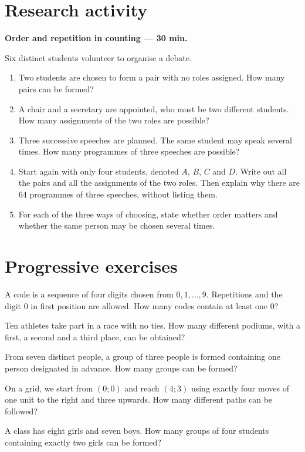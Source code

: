 \section{Research activity}\textbf{Order and repetition in counting --- 30 min.}\par Six distinct students volunteer to organise a debate.
\begin{enumerate}\item Two students are chosen to form a pair with no roles assigned. How many pairs can be formed?
\item A chair and a secretary are appointed, who must be two different students. How many assignments of the two roles are possible?
\item Three successive speeches are planned. The same student may speak several times. How many programmes of three speeches are possible?
\item Start again with only four students, denoted $A$, $B$, $C$ and $D$. Write out all the pairs and all the assignments of the two roles. Then explain why there are $64$ programmes of three speeches, without listing them.
\item For each of the three ways of choosing, state whether order matters and whether the same person may be chosen several times.\end{enumerate}

\section{Progressive exercises}

A code is a sequence of four digits chosen from $0,1,\ldots,9$. Repetitions and the digit $0$ in first position are allowed. How many codes contain at least one $0$?

Ten athletes take part in a race with no ties. How many different podiums, with a first, a second and a third place, can be obtained?

From seven distinct people, a group of three people is formed containing one person designated in advance. How many groups can be formed?

On a grid, we start from $(0;0)$ and reach $(4;3)$ using exactly four moves of one unit to the right and three upwards. How many different paths can be followed?

A class has eight girls and seven boys. How many groups of four students containing exactly two girls can be formed?

